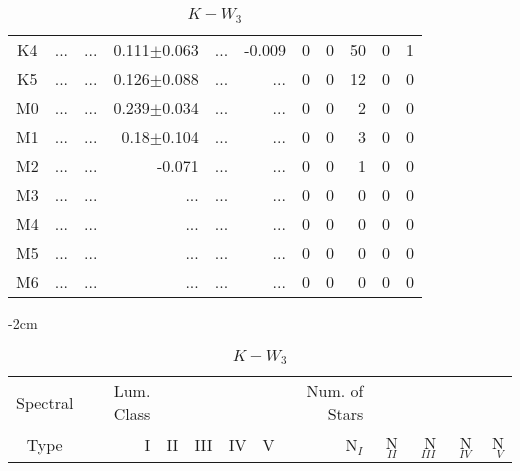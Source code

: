 \begin{table}[t]
\begin{table}[t]
\begin{center}
\begin{tabular}{c|rrrrr|rrrrr}
    K4	&	 ...	&	 ...	&	0.111$\pm$0.063	&	 ...	&	-0.009	&	0	&	0	&	50	&	0	&	1	\\
    K5	&	 ...	&	 ...	&	0.126$\pm$0.088	&	 ...	&	 ...	&	0	&	0	&	12	&	0	&	0	\\
    M0	&	 ...	&	 ...	&	0.239$\pm$0.034	&	 ...	&	 ...	&	0	&	0	&	2	&	0	&	0	\\
    M1	&	 ...	&	 ...	&	0.18$\pm$0.104	&	 ...	&	 ...	&	0	&	0	&	3	&	0	&	0	\\
    M2	&	 ...	&	 ...	&	-0.071	&	 ...	&	 ...	&	0	&	0	&	1	&	0	&	0	\\
    M3	&	 ...	&	 ...	&	 ...	&	 ...	&	 ...	&	0	&	0	&	0	&	0	&	0	\\
    M4	&	 ...	&	 ...	&	 ...	&	 ...	&	 ...	&	0	&	0	&	0	&	0	&	0	\\
    M5	&	 ...	&	 ...	&	 ...	&	 ...	&	 ...	&	0	&	0	&	0	&	0	&	0	\\
    M6	&	 ...	&	 ...	&	 ...	&	 ...	&	 ...	&	0	&	0	&	0	&	0	&	0	\\
        \bottomrule
        \end{tabular}
    \end{center}
    \end{table}
    
    \begin{table}[t]
    \tiny
    \centering
    \caption{$K-W_{3}$}
    \begin{center}
        \addtolength{\leftskip} {-2cm}
        \addtolength{\rightskip}{-2cm}
        \begin{tabular}{c|rrrrr|rrrrr}
        \toprule
        Spectral & Lum. Class & & & & & Num. of Stars & & & &  \\
        Type & I & II & III &  IV & V & N$_{I}$ & N$_{II}$ & N$_{III}$ & N$_{IV}$ & N$_{V}$ \\ \midrule
      

\end{tabular}
\end{center}
\end{table}
\end{table}
